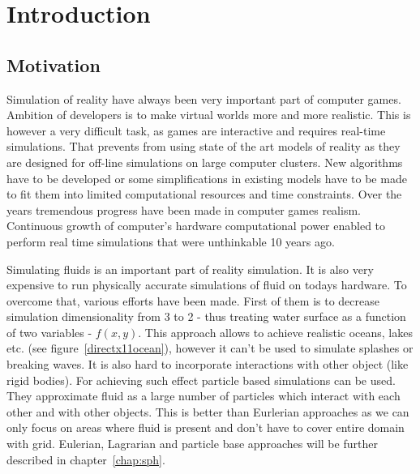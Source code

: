 

\chapter{Introduction}

\graphicspath{{introduction/figures/}}


\section{Motivation}

Simulation of reality have always been very important part of computer games. Ambition of developers is to make virtual worlds more and more realistic. This is however a very difficult task, as games are interactive and requires real-time simulations. That prevents from using state of the art models of reality as they are designed for off-line simulations on large computer clusters. New algorithms have to be developed or some simplifications in existing models have to be made to fit them into limited computational resources and time constraints. Over the years tremendous progress have been made in computer games realism. Continuous growth of computer's hardware computational power enabled to perform real time simulations that were unthinkable 10 years ago. 

Simulating fluids is an important part of reality simulation. It is also very expensive to run physically accurate simulations of fluid on todays hardware. To overcome that, various efforts have been made. First of them is to decrease simulation dimensionality from 3 to 2 - thus treating water surface as a function of two variables - $f(x, y)$. This approach allows to achieve realistic oceans, lakes etc. (see figure~\ref{directx11ocean}), however it can't be used to simulate splashes or breaking waves. It is also hard to incorporate interactions with other object (like rigid bodies). For achieving such effect particle based simulations can be used. They approximate fluid as a large number of particles which interact with each other and with other objects. This is better than Eurlerian approaches as we can only focus on areas where fluid is present and don't have to cover entire domain with grid. Eulerian, Lagrarian and particle base approaches will be further described in chapter~\ref{chap:sph}.  

